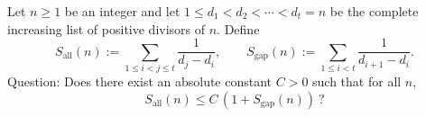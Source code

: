 Let $n\ge 1$ be an integer and let $1\le d_1<d_2<\cdots<d_t=n$ be the complete increasing list of positive divisors of $n$.
Define
\[S_{\mathrm{all}}(n):=\sum_{1\le i<j\le t}\frac{1}{d_j-d_i},\qquad S_{\mathrm{gap}}(n):=\sum_{1\le i<t}\frac{1}{d_{i+1}-d_i}.
\]
Question: Does there exist an absolute constant $C>0$ such that for all $n$,
\[S_{\mathrm{all}}(n)\le C\,(1+S_{\mathrm{gap}}(n))\ ?\]
